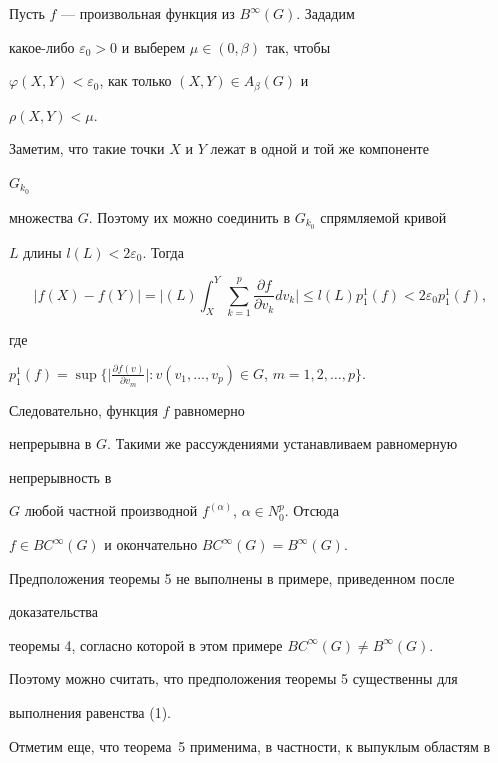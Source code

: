 \begin{pf}


Пусть $f$ --- произвольная функция из $B^{\infty}(G)$. Зададим


какое-либо $\varepsilon_0>0$ и выберем $\mu\in (0,\beta)$ так, чтобы


$\varphi(X,Y)<\varepsilon_0$, как только $(X,Y)\in A_{\beta}(G)$ и


$\rho(X,Y)<\mu$.


Заметим, что такие точки $X$ и $Y$ лежат в одной и той же компоненте


$G_{k_0}$


множества $G$. Поэтому их можно соединить в $G_{k_0}$ спрямляемой кривой


$L$ длины $l(L)<2\varepsilon_0$. Тогда


$$


|f(X)-f(Y)|=\bigg|(L)\int_X^Y


\sum_{k=1}^p\frac{\partial f}{\partial v_k}dv_k\bigg|\leqslant


l(L)p^1_1(f)<2\varepsilon_0 p^1_1(f),


$$


где


$p^1_1(f)=\sup\big\{\big| \frac{\partial f(v)}{\partial v_m}


\big|: v(v_1,\dotsc,v_p)\in G$, $m=1,2,\dotsc,p\big\}$.


Следовательно, функция $f$ равномерно


непрерывна в $G$. Такими же рассуждениями устанавливаем равномерную


непрерывность в


$G$ любой частной производной $f^{(\alpha)}$, $\alpha\in N_0^p$. Отсюда


$f\in BC^{\infty}(G)$ и окончательно $BC^{\infty}(G)=B^{\infty}(G)$.


\end{pf}





Предположения теоремы 5 не выполнены в примере, приведенном после


доказательства


теоремы 4, согласно которой в этом примере $BC^{\infty}(G)\neq


B^{\infty}(G)$.


Поэтому можно считать, что предположения теоремы 5 существенны для


выполнения равенства (1).


Отметим еще, что теорема~5 применима, в частности, к выпуклым областям в


